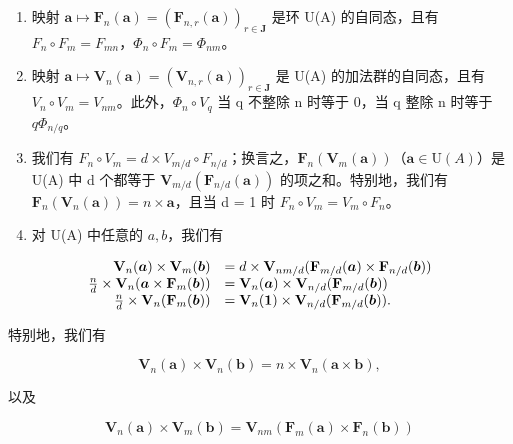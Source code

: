 \begin{enumerate}
\def\labelenumi{\alph{enumi})}
\item
  映射 \(\boldsymbol{a} \mapsto \mathbf{F}_{n}(\boldsymbol{a}) = (\mathbf{F}_{n,r}(\boldsymbol{a}))_{r \in \mathbf{J}}\) 是环 U(A) 的自同态，且有 \(F_{n} \circ F_{m} = F_{mn}\)，\(\Phi_{n} \circ F_{m} = \Phi_{nm}\)。
\item
  映射 \(\boldsymbol{a} \mapsto \mathbf{V}_{n}(\boldsymbol{a}) = (\mathbf{V}_{n,r}(\boldsymbol{a}))_{r \in \mathbf{J}}\) 是 U(A) 的加法群的自同态，且有 \(V_{n} \circ V_{m} = V_{nm}\)。此外，\(\Phi_{n} \circ V_{q}\) 当 q 不整除 n 时等于 0，当 q 整除 n 时等于 \(q\Phi_{n/q}\)。
\item
  我们有 \(F_{n} \circ V_{m} = d \times V_{m/d} \circ F_{n/d}\)；换言之，\(\mathbf{F}_{n}(\mathbf{V}_{m}(\boldsymbol{a}))\)（\(\boldsymbol{a} \in \mathrm{U}(A)\)）是 U(A) 中 d 个都等于 \(\mathbf{V}_{m/d}(\mathbf{F}_{n/d}(\boldsymbol{a}))\) 的项之和。特别地，我们有 \(\mathbf{F}_{n}(\mathbf{V}_{n}(\boldsymbol{a})) = n \times \boldsymbol{a}\)，且当 d = 1 时 \(F_{n} \circ V_{m} = V_{m} \circ F_{n}\)。
\item
  对 U(A) 中任意的 \(a, b\)，我们有
\end{enumerate}

\[
\begin{array}{r l} \mathbf {V} _ {n} (\boldsymbol {a}) \times \mathbf {V} _ {m} (\boldsymbol {b}) & = d \times \mathbf {V} _ {n m / d} (\mathbf {F} _ {m / d} (\boldsymbol {a}) \times \mathbf {F} _ {n / d} (\boldsymbol {b})) \\ \frac {n}{d} \times \mathbf {V} _ {n} (\boldsymbol {a} \times \mathbf {F} _ {m} (\boldsymbol {b})) & = \mathbf {V} _ {n} (\boldsymbol {a}) \times \mathbf {V} _ {n / d} (\mathbf {F} _ {m / d} (\boldsymbol {b})) \\ \frac {n}{d} \times \mathbf {V} _ {n} (\mathbf {F} _ {m} (\boldsymbol {b})) & = \mathbf {V} _ {n} (\mathbf {1}) \times \mathbf {V} _ {n / d} (\mathbf {F} _ {m / d} (\boldsymbol {b}))  . \end{array}
\]

特别地，我们有

\[
\mathbf {V} _ {n} (\boldsymbol {a}) \times \mathbf {V} _ {n} (\boldsymbol {b}) = n \times \mathbf {V} _ {n} (\boldsymbol {a} \times \boldsymbol {b}),
\]

以及

\[
\mathbf {V} _ {n} (\boldsymbol {a}) \times \mathbf {V} _ {m} (\boldsymbol {b}) = \mathbf {V} _ {n m} (\mathbf {F} _ {m} (\boldsymbol {a}) \times \mathbf {F} _ {n} (\boldsymbol {b}))
\]

